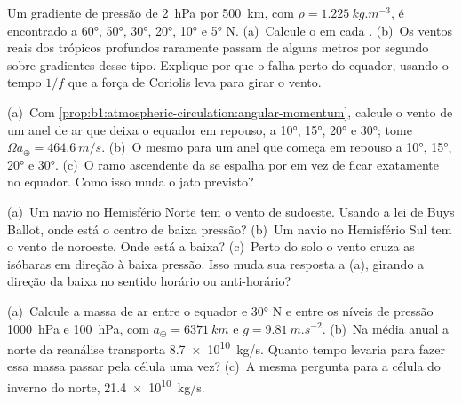 \begin{exercise}[$\star\star$]\label{exo:b1:atmospheric-circulation:5}
Um gradiente de pressão de \qty{2}{hPa} por \qty{500}{km}, com $\rho =
\qty{1.225}{kg.m^{-3}}$, é encontrado a \ang{60}, \ang{50}, \ang{30}, \ang{20}, \ang{10} e \ang{5} N.
(a)~Calcule o  em cada . (b)~Os ventos reais dos trópicos profundos raramente
passam de alguns metros por segundo sobre gradientes desse tipo. Explique por que o  falha perto do equador, usando o tempo $1/f$ que a força de Coriolis leva para girar o vento.
\end{exercise}

\begin{exercise}[$\star\star$]\label{exo:b1:atmospheric-circulation:6}
(a)~Com \cref{prop:b1:atmospheric-circulation:angular-momentum}, calcule o vento de um anel de ar que
deixa o equador em repouso, a \ang{10}, \ang{15}, \ang{20} e \ang{30}; tome $\Omega a_\oplus = \qty{464.6}{m/s}$. (b)~O mesmo para um anel que começa em repouso a \ang{10}, \ang{15}, \ang{20} e
\ang{30}. (c)~O ramo ascendente da  se espalha por  em vez de ficar exatamente
no equador. Como isso muda o jato previsto?
\end{exercise}

\begin{exercise}[$\star\star$]\label{exo:b1:atmospheric-circulation:7}
(a)~Um navio no Hemisfério Norte tem o vento de sudoeste. Usando a lei de Buys Ballot, onde está o
centro de baixa pressão? (b)~Um navio no Hemisfério Sul tem o vento de noroeste. Onde está a baixa?
(c)~Perto do solo o vento cruza as isóbaras em direção à baixa pressão. Isso muda sua resposta a (a),
girando a direção da baixa no sentido horário ou anti-horário?
\end{exercise}

\begin{exercise}[$\star\star$]\label{exo:b1:atmospheric-circulation:8}
(a)~Calcule a massa de ar entre o equador e \ang{30} N e entre os níveis de pressão \qty{1000}{hPa} e
\qty{100}{hPa}, com $a_\oplus = \qty{6371}{km}$ e $g = \qty{9.81}{m.s^{-2}}$. (b)~Na média anual a  norte da reanálise transporta \qty{8.7e10}{kg/s}. Quanto tempo levaria para fazer essa massa
passar pela célula uma vez? (c)~A mesma pergunta para a célula do inverno do norte, \qty{21.4e10}{kg/s}.
\end{exercise}


